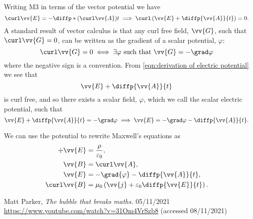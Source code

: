 \documentclass[fleqn]{NotesClass}
\begin{document}
\begin{appendices}
        Writing M3 in terms of the vector potential we have
        \begin{equation}\label{eqn:derivation of electric potential}
            \curl \vv{E} = -\diffp*{(\curl\vv{A})}{t} \implies \curl \left( \vv{E} + \diffp{\vv{A}}{t} \right) = 0.
        \end{equation}
        A standard result of vector calculus is that any curl free field, \(\vv{G}\), such that \(\curl\vv{G} = 0\), can be written as the gradient of a scalar potential, \(\varphi\):
        \begin{equation}
            \curl \vv{G} = 0 \iff \exists \varphi \text{ such that } \vv{G} = -\grad\varphi
        \end{equation}
        where the negative sign is a convention.
        From \cref{eqn:derivation of electric potential} we see that
        \begin{equation}
            \vv{E} + \diffp{\vv{A}}{t}
        \end{equation}
        is curl free, and so there exists a scalar field, \(\varphi\), which we call the scalar electric potential, such that
        \begin{equation}
            \vv{E} + \diffp{\vv{A}}{t} = -\grad\varphi \implies \vv{E} = -\grad\varphi - \diffp{\vv{A}}{t}.
        \end{equation}
        
        We can use the potential to rewrite Maxwell's equations as
        \begin{align}
            \div \vv{E} &= \frac{\rho}{\varepsilon_0},\\
            \vv{B} &= \curl\vv{A},\\
            \vv{E} &= -\grad{\varphi} - \diffp{\vv{A}}{t},\\
            \curl \vv{B} &= \mu_0\left( \vv{j} + \varepsilon_0\diffp{\vv{E}}{t} \right).
        \end{align}
    \end{appendices}
    
    \backmatter
    \begin{thebibliography}{9}
         Matt Parker, \textit{The bubble that breaks maths.} 05/11/2021 \url{https://www.youtube.com/watch?v=31Om4VrSzb8} (accessed 08/11/2021)
    \end{thebibliography}
    \renewcommand{\glossaryname}{Acronyms}
    \printglossary[acronym]
    \printindex
\end{document}
